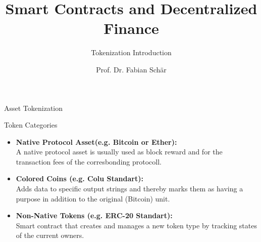 \documentclass[handout]{beamer}
\title{Smart Contracts and Decentralized Finance}
\subtitle{Tokenization Introduction}
\author{Prof. Dr. Fabian Schär}
\institute{University of Basel}
\begin{document}
\thispagestyle{empty}
\begin{frame}[noframenumbering]
	\titlepage
\end{frame}


\begin{frame}{Asset Tokenization}
	\begin{figure} [h]
 		\center
			
 	\end{figure}
\end{frame}

\begin{frame}{Token Categories}
	\begin{itemize}
		\item<1-> \textbf{Native Protocol Asset(e.g. Bitcoin or Ether):} \\
					A native protocol asset is usually used as block reward and for the transaction fees of the corresbonding protocoll.
\vspace{0.5em}		
		
		\item<2-> \textbf{Colored Coins (e.g. Colu Standart):} \\
					Adds data to specific output strings and thereby marks them as having a purpose in addition to the original (Bitcoin) unit.
\vspace{0.5em}			
		
		\item<3-> \textbf{Non-Native Tokens (e.g. ERC-20 Standart):} \\
					Smart contract that creates and manages a new token type by tracking states of the current owners.	 
	\end{itemize}
	
\end{frame}
\end{document}
